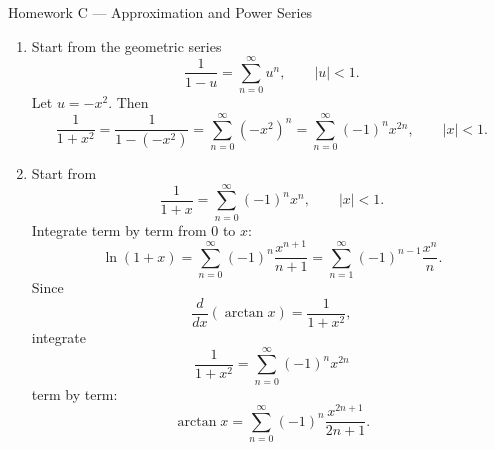 \documentclass[11pt]{article}
\begin{document}
\begin{theorybox}{Homework C --- Approximation and Power Series}
\begin{enumerate}
    Check endpoints:
    \begin{itemize}
        \item At \(x=5\):
        \[
        \sum_{n=1}^{\infty}\frac{4^n}{n4^n}
        =
        \sum_{n=1}^{\infty}\frac1n
        \]
        diverges.
        \item At \(x=-3\):
        \[
        \sum_{n=1}^{\infty}\frac{(-4)^n}{n4^n}
        =
        \sum_{n=1}^{\infty}\frac{(-1)^n}{n}
        \]
        converges.
    \end{itemize}
    Therefore the interval of convergence is
    \[
    [-3,5).
    \]

    \item
    Start from the geometric series
    \[
    \frac{1}{1-u}=\sum_{n=0}^{\infty}u^n,\qquad |u|<1.
    \]
    Let \(u=-x^2\). Then
    \[
    \frac{1}{1+x^2}
    =
    \frac{1}{1-(-x^2)}
    =
    \sum_{n=0}^{\infty}(-x^2)^n
    =
    \sum_{n=0}^{\infty}(-1)^n x^{2n},
    \qquad |x|<1.
    \]

    \item
    Start from
    \[
    \frac{1}{1+x}
    =
    \sum_{n=0}^{\infty}(-1)^n x^n,
    \qquad |x|<1.
    \]
    Integrate term by term from \(0\) to \(x\):
    \[
    \ln(1+x)
    =
    \sum_{n=0}^{\infty}(-1)^n\frac{x^{n+1}}{n+1}
    =
    \sum_{n=1}^{\infty}(-1)^{n-1}\frac{x^n}{n}.
    \]
    Since
    \[
    \frac{d}{dx}(\arctan x)=\frac{1}{1+x^2},
    \]
    integrate
    \[
    \frac{1}{1+x^2}
    =
    \sum_{n=0}^{\infty}(-1)^n x^{2n}
    \]
    term by term:
    \[
    \arctan x
    =
    \sum_{n=0}^{\infty}(-1)^n\frac{x^{2n+1}}{2n+1}.
    \]
\end{enumerate}
\end{theorybox}
\end{document}
